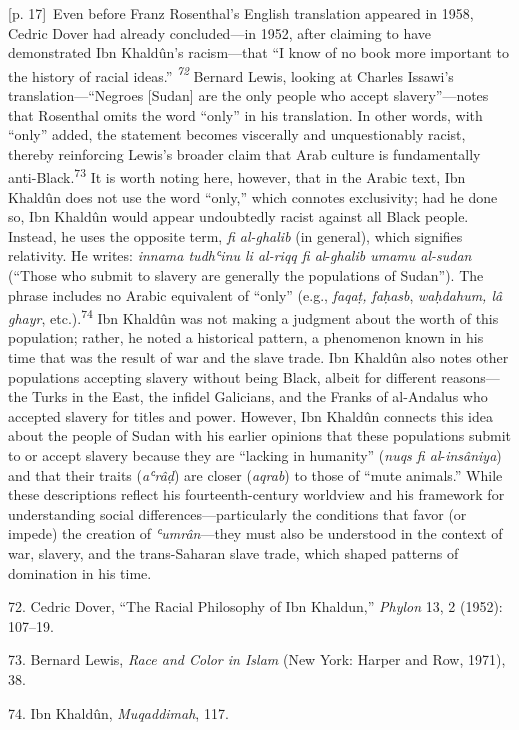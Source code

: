 \documentclass[10pt,a4paper]{article}
\begin{document}
{\scriptsize\color{gray} [p. 17]}\ Even before Franz Rosenthal’s English translation appeared in 1958, Cedric Dover had already concluded—in 1952, after claiming to have demonstrated Ibn Khaldûn’s racism—that “I know of no book more important to the history of racial ideas.”\textit{ \nobreak\textsuperscript{72} } Bernard Lewis, looking at Charles Issawi’s translation—“Negroes [Sudan] are the only people who accept slavery”—notes that Rosenthal omits the word “only” in his translation. In other words, with “only” added, the statement becomes viscerally and unquestionably racist, thereby reinforcing Lewis’s broader claim that Arab culture is fundamentally anti-Black.\nobreak\textsuperscript{73} It is worth noting here, however, that in the Arabic text, Ibn Khaldûn does not use the word “only,” which connotes exclusivity; had he done so, Ibn Khaldûn would appear undoubtedly racist against all Black people. Instead, he uses the opposite term, \textit{fi al-ghalib} (in general), which signifies relativity. He writes: \textit{innama tudhʿinu li al-riqq fi al}-\textit{ghalib umamu al-sudan} (“Those who submit to slavery are generally the populations of Sudan”). The phrase includes no Arabic equivalent of “only” (e.g., \textit{faqaṭ, faḥasb}, \textit{waḥdahum, lâ ghayr}, etc.).\nobreak\textsuperscript{74} Ibn Khaldûn was not making a judgment about the worth of this population; rather, he noted a historical pattern, a phenomenon known in his time that was the result of war and the slave trade. Ibn Khaldûn also notes other populations accepting slavery without being Black, albeit for different reasons—the Turks in the East, the infidel Galicians, and the Franks of al-Andalus who accepted slavery for titles and power. However, Ibn Khaldûn connects this idea about the people of Sudan with his earlier opinions that these populations submit to or accept slavery because they are “lacking in humanity” (\textit{nuqs fi al}-\textit{insâniya}) and that their traits (\textit{aʿrâḍ}) are closer (\textit{aqrab}) to those of “mute animals.” While these descriptions reflect his fourteenth-century worldview and his framework for understanding social differences—particularly the conditions that favor (or impede) the creation of \textit{ʿumrân}—they must also be understood in the context of war, slavery, and the trans-Saharan slave trade, which shaped patterns of domination in his time.\par{\small 72. Cedric Dover, “The Racial Philosophy of Ibn Khaldun,” \textit{Phylon} 13, 2 (1952): 107–19.\par}{\small 73. Bernard Lewis, \textit{Race and Color in Islam} (New York: Harper and Row, 1971), 38.\par}{\small 74. Ibn Khaldûn, \textit{Muqaddimah}, 117.\par}
\end{document}
